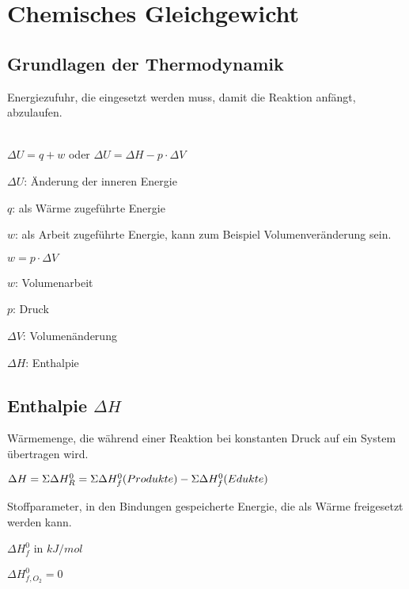 \section{Chemisches Gleichgewicht}

\subsection{Grundlagen der Thermodynamik}

\begin{definition}[Aktivierungsenergie]
	Energiezufuhr, die eingesetzt werden muss, damit die Reaktion anfängt, abzulaufen.
\end{definition}

\begin{definition}
	\leavevmode \\
	$\Delta U = q+w$ oder $\Delta U = \Delta H - p \cdot \Delta V$
	
	$\Delta U$: Änderung der inneren Energie
	
	$q$: als Wärme zugeführte Energie
	
	$w$: als Arbeit zugeführte Energie, kann zum Beispiel Volumenveränderung sein.

\end{definition}

\begin{definition}[Volumenarbeit]
	$w = p \cdot \Delta V$
	
	$w$: Volumenarbeit
	
	$p$: Druck
	
	$\Delta V$: Volumenänderung
	
	$\Delta H$: Enthalpie
	
\end{definition}

\subsection{Enthalpie $\Delta H$}

	Wärmemenge, die während einer Reaktion bei konstanten Druck auf ein System übertragen wird.
	
	\large{
		$\Delta H = \\ \Sigma \Delta H^0_R = \Sigma \Delta H^0_f (Produkte) - \Sigma \Delta H^0_f (Edukte)$
	}

\begin{definition}[Standardbildungsenthalpie]
	Stoffparameter, in den Bindungen gespeicherte Energie, die als Wärme freigesetzt werden kann.
	
	$\Delta H^0_f$ in $kJ/mol$
	
	\begin{note}
		$\Delta H^0_{f,O_2} = 0$
	\end{note}

\end{definition}

